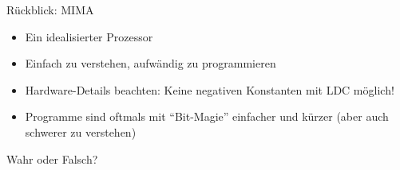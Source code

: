 




\usepackage{tikz}
\usetikzlibrary{arrows}
   \usetikzlibrary{automata}
   \usetikzlibrary{matrix}
\usepackage{url}

\graphicspath{{../figures/}}





\framePrevEpisode

\begin{frame}{Rückblick: MIMA}
	\begin{itemize}[<+->]
		\item Ein idealisierter Prozessor
		\item Einfach zu verstehen, aufwändig zu programmieren
		\item Hardware-Details beachten: Keine negativen Konstanten mit LDC möglich!
		\item Programme sind oftmals mit \enquote{Bit-Magie} einfacher und kürzer (aber auch schwerer zu verstehen)
	\end{itemize}
\end{frame}

\begin{frame}{Wahr oder Falsch?}
	\begin{block}{}
	\begin{itemize}
	\end{itemize}
	\end{block}
\end{frame}


